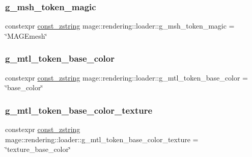 \hypertarget{namespacemage_1_1rendering_1_1loader_ac002ee9ece4bdae053226c72336f84e3}{}\label{namespacemage_1_1rendering_1_1loader_ac002ee9ece4bdae053226c72336f84e3} 
\subsubsection{\texorpdfstring{g\+\_\+msh\+\_\+token\+\_\+magic}{g\_msh\_token\_magic}}
{\footnotesize\ttfamily constexpr \hyperlink{namespacemage_abfd9206dc607ceb5d13ec68bf075a5c0}{const\+\_\+zstring} mage\+::rendering\+::loader\+::g\+\_\+msh\+\_\+token\+\_\+magic = \char`\"{}M\+A\+G\+Emesh\char`\"{}}

\hypertarget{namespacemage_1_1rendering_1_1loader_a374c1913982c15a9b219effa2e11cad7}{}\label{namespacemage_1_1rendering_1_1loader_a374c1913982c15a9b219effa2e11cad7} 
\subsubsection{\texorpdfstring{g\+\_\+mtl\+\_\+token\+\_\+base\+\_\+color}{g\_mtl\_token\_base\_color}}
{\footnotesize\ttfamily constexpr \hyperlink{namespacemage_abfd9206dc607ceb5d13ec68bf075a5c0}{const\+\_\+zstring} mage\+::rendering\+::loader\+::g\+\_\+mtl\+\_\+token\+\_\+base\+\_\+color = \char`\"{}base\+\_\+color\char`\"{}}

\hypertarget{namespacemage_1_1rendering_1_1loader_aa3dfb00f93883473d1ff397f0079364e}{}\label{namespacemage_1_1rendering_1_1loader_aa3dfb00f93883473d1ff397f0079364e} 
\subsubsection{\texorpdfstring{g\+\_\+mtl\+\_\+token\+\_\+base\+\_\+color\+\_\+texture}{g\_mtl\_token\_base\_color\_texture}}
{\footnotesize\ttfamily constexpr \hyperlink{namespacemage_abfd9206dc607ceb5d13ec68bf075a5c0}{const\+\_\+zstring} mage\+::rendering\+::loader\+::g\+\_\+mtl\+\_\+token\+\_\+base\+\_\+color\+\_\+texture = \char`\"{}texture\+\_\+base\+\_\+color\char`\"{}}

